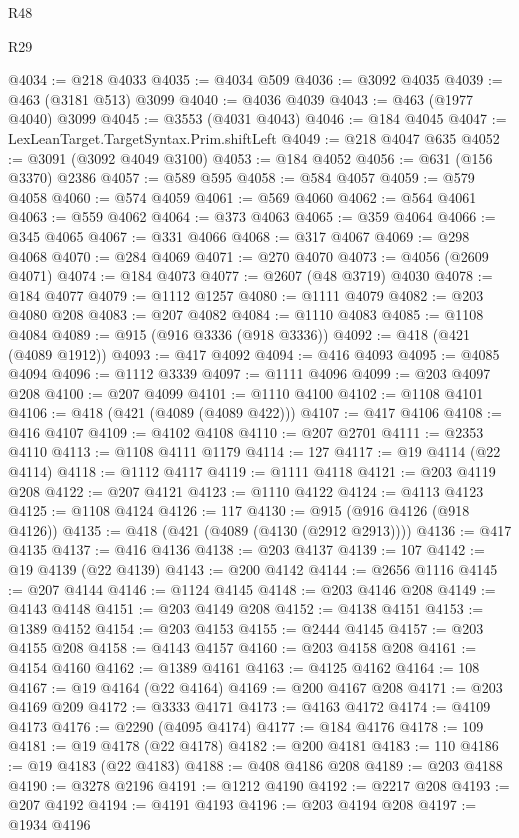 \begin{lexlean}{R48}
\begin{lexlean}{R29}
\begin{coremodule}
{{{{{{{{{{{{{{{{{{{{{{{{{{{{{{{{{{{{{{{{{{{{{{{{{{{{{{{{{{{{{{{{{{{{{{{{{{{{{{{{{{{{{{{{{{{{{{{{{{{{{{{{{{{{{{{{{{{{{{{{{{{{{{{{{{{{{{{{{{{{{{{{{{{{{{{{{{{{{{{{{{{{{{{{{{{{{{{{{{{{{{{{{{{{{{{{{{{{{{{{{{{{{{{{{{{{{{{{{{@4034 := @218 @4033
@4035 := @4034 @509
@4036 := @3092 @4035
@4039 := @463 (@3181 @513) @3099
@4040 := @4036 @4039
@4043 := @463 (@1977 @4040) @3099
@4045 := @3553 (@4031 @4043)
@4046 := @184 @4045
@4047 := LexLeanTarget.TargetSyntax.Prim.shiftLeft
@4049 := @218 @4047 @635
@4052 := @3091 (@3092 @4049 @3100)
@4053 := @184 @4052
@4056 := @631 (@156 @3370) @2386
@4057 := @589 @595
@4058 := @584 @4057
@4059 := @579 @4058
@4060 := @574 @4059
@4061 := @569 @4060
@4062 := @564 @4061
@4063 := @559 @4062
@4064 := @373 @4063
@4065 := @359 @4064
@4066 := @345 @4065
@4067 := @331 @4066
@4068 := @317 @4067
@4069 := @298 @4068
@4070 := @284 @4069
@4071 := @270 @4070
@4073 := @4056 (@2609 @4071)
@4074 := @184 @4073
@4077 := @2607 (@48 @3719) @4030
@4078 := @184 @4077
@4079 := @1112 @1257
@4080 := @1111 @4079
@4082 := @203 @4080 @208
@4083 := @207 @4082
@4084 := @1110 @4083
@4085 := @1108 @4084
@4089 := @915 (@916 @3336 (@918 @3336))
@4092 := @418 (@421 (@4089 @1912))
@4093 := @417 @4092
@4094 := @416 @4093
@4095 := @4085 @4094
@4096 := @1112 @3339
@4097 := @1111 @4096
@4099 := @203 @4097 @208
@4100 := @207 @4099
@4101 := @1110 @4100
@4102 := @1108 @4101
@4106 := @418 (@421 (@4089 (@4089 @422)))
@4107 := @417 @4106
@4108 := @416 @4107
@4109 := @4102 @4108
@4110 := @207 @2701
@4111 := @2353 @4110
@4113 := @1108 @4111 @1179
@4114 := 127
@4117 := @19 @4114 (@22 @4114)
@4118 := @1112 @4117
@4119 := @1111 @4118
@4121 := @203 @4119 @208
@4122 := @207 @4121
@4123 := @1110 @4122
@4124 := @4113 @4123
@4125 := @1108 @4124
@4126 := 117
@4130 := @915 (@916 @4126 (@918 @4126))
@4135 := @418 (@421 (@4089 (@4130 (@2912 @2913))))
@4136 := @417 @4135
@4137 := @416 @4136
@4138 := @203 @4137
@4139 := 107
@4142 := @19 @4139 (@22 @4139)
@4143 := @200 @4142
@4144 := @2656 @1116
@4145 := @207 @4144
@4146 := @1124 @4145
@4148 := @203 @4146 @208
@4149 := @4143 @4148
@4151 := @203 @4149 @208
@4152 := @4138 @4151
@4153 := @1389 @4152
@4154 := @203 @4153
@4155 := @2444 @4145
@4157 := @203 @4155 @208
@4158 := @4143 @4157
@4160 := @203 @4158 @208
@4161 := @4154 @4160
@4162 := @1389 @4161
@4163 := @4125 @4162
@4164 := 108
@4167 := @19 @4164 (@22 @4164)
@4169 := @200 @4167 @208
@4171 := @203 @4169 @209
@4172 := @3333 @4171
@4173 := @4163 @4172
@4174 := @4109 @4173
@4176 := @2290 (@4095 @4174)
@4177 := @184 @4176
@4178 := 109
@4181 := @19 @4178 (@22 @4178)
@4182 := @200 @4181
@4183 := 110
@4186 := @19 @4183 (@22 @4183)
@4188 := @408 @4186 @208
@4189 := @203 @4188
@4190 := @3278 @2196
@4191 := @1212 @4190
@4192 := @2217 @208
@4193 := @207 @4192
@4194 := @4191 @4193
@4196 := @203 @4194 @208
@4197 := @1934 @4196
}}}}}}}}}}}}}}}}}}}}}}}}}}}}}}}}}}}}}}}}}}}}}}}}}}}}}}}}}}}}}}}}}}}}}}}}}}}}}}}}}}}}}}}}}}}}}}}}}}}}}}}}}}}}}}}}}}}}}}}}}}}}}}}}}}}}}}}}}}}}}}}}}}}}}}}}}}}}}}}}}}}}}}}}}}}}}}}}}}}}}}}}}}}}}}}}}}}}}}}}}}}}}}}}}}}}}}}}}}
\end{coremodule}
\end{lexlean}
\end{lexlean}
